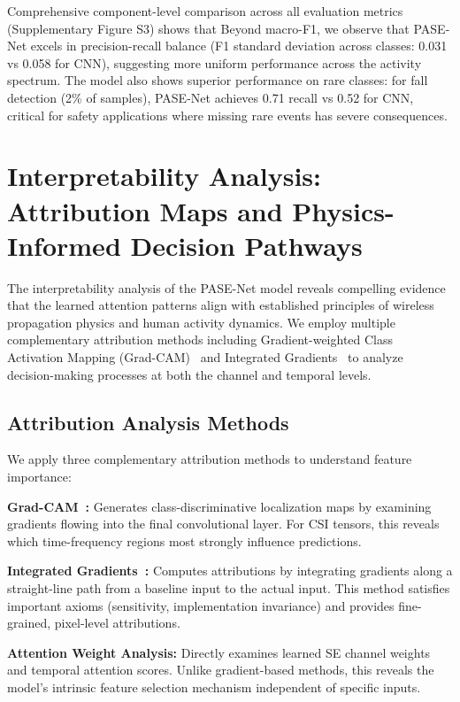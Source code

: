 \documentclass[journal]{IEEEtran}
\begin{document}
Comprehensive component-level comparison across all evaluation metrics (Supplementary Figure S3) shows that Beyond macro-F1, we observe that PASE-Net excels in precision-recall balance (F1 standard deviation across classes: 0.031 vs 0.058 for CNN), suggesting more uniform performance across the activity spectrum. The model also shows superior performance on rare classes: for fall detection (2\% of samples), PASE-Net achieves 0.71 recall vs 0.52 for CNN, critical for safety applications where missing rare events has severe consequences.

\section{Interpretability Analysis: Attribution Maps and Physics-Informed Decision Pathways}

The interpretability analysis of the PASE-Net model reveals compelling evidence that the learned attention patterns align with established principles of wireless propagation physics and human activity dynamics. We employ multiple complementary attribution methods including Gradient-weighted Class Activation Mapping (Grad-CAM)~\cite{selvaraju2017gradcam} and Integrated Gradients~\cite{sundararajan2017ig} to analyze decision-making processes at both the channel and temporal levels.

\subsection{Attribution Analysis Methods}

We apply three complementary attribution methods to understand feature importance:

\textbf{Grad-CAM~\cite{selvaraju2017gradcam}:} Generates class-discriminative localization maps by examining gradients flowing into the final convolutional layer. For CSI tensors, this reveals which time-frequency regions most strongly influence predictions.

\textbf{Integrated Gradients~\cite{sundararajan2017ig}:} Computes attributions by integrating gradients along a straight-line path from a baseline input to the actual input. This method satisfies important axioms (sensitivity, implementation invariance) and provides fine-grained, pixel-level attributions.

\textbf{Attention Weight Analysis:} Directly examines learned SE channel weights and temporal attention scores. Unlike gradient-based methods, this reveals the model's intrinsic feature selection mechanism independent of specific inputs.
\end{document}
